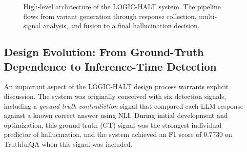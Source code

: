 \begin{figure}[!htbp]
    \centering
    \caption{High-level architecture of the LOGIC-HALT system. The pipeline flows from variant generation through response collection, multi-signal analysis, and fusion to a final hallucination decision.}
    \label{fig:architecture}
\end{figure}

\subsection{Design Evolution: From Ground-Truth Dependence to Inference-Time Detection}

An important aspect of the LOGIC-HALT design process warrants explicit discussion. The system was originally conceived with six detection signals, including a \emph{ground-truth contradiction} signal that compared each LLM response against a known correct answer using NLI. During initial development and optimization, this ground-truth (GT) signal was the strongest individual predictor of hallucination, and the system achieved an F1 score of 0.7730 on TruthfulQA when this signal was included.

